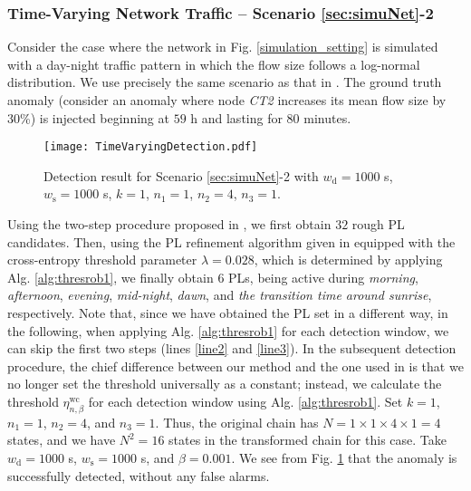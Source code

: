 \documentclass[10pt, twocolumn]{IEEEtran}
\begin{document}
\subsubsection{Time-Varying Network Traffic -- Scenario
  \ref{sec:simuNet}-2}

Consider the case where the network in Fig. \ref{simulation_setting} is
simulated with a day-night traffic pattern in which the flow size
follows a log-normal distribution. We use precisely the same scenario as
that in \cite[Sec. IV.B.2]{robust-anomaly-tcns}. The ground truth
anomaly (consider an anomaly where node \textit{CT2} increases its mean
flow size by 30\%) is injected beginning at $59$ h and lasting for $80$
minutes.

\begin{figure}[ht]  
	\centering
	\texttt{[image: TimeVaryingDetection.pdf]}
	\caption{Detection result for Scenario \ref{sec:simuNet}-2 with $w_{\text{d}} = 1000$ s, $w_{\text{s}} = 1000$ s, $k =1$, $n_1 = 1$, $n_2 = 4$, $n_3 = 1$.}
	\label{time-varying-detect}
\end{figure}
Using the two-step procedure proposed in
\cite[Sec. III.C]{robust-anomaly-tcns}, we first obtain $32$ rough PL
candidates. Then, using the PL refinement algorithm given in
\cite[Sec. III.D]{robust-anomaly-tcns} equipped with the cross-entropy
threshold parameter $\lambda = 0.028$, which is
determined by applying Alg. \ref{alg:thresrob1}, we finally obtain $6$
PLs, being active during \textit{morning}, \textit{afternoon},
\textit{evening}, \textit{mid-night}, \textit{dawn}, and \textit{the
  transition time around sunrise}, respectively. Note that, since we
have obtained the PL set in a different way, in the following, when
applying Alg. \ref{alg:thresrob1} for each detection window, we can skip
the first two steps (lines \ref{line2} and \ref{line3}). In the
subsequent detection procedure, the chief difference between our method
and the one used in \cite{robust-anomaly-tcns} is that we no longer set
the threshold universally as a constant; instead, we calculate the
threshold $\eta_{n,\beta}^{\text{wc}}$ for each detection window using
Alg. \ref{alg:thresrob1}. Set $k = 1$, $n_1 = 1$, $n_2 = 4$, and $n_3 =
1$. Thus, the original chain has $N = 1 \times 1 \times 4 \times 1 = 4$
states, and we have $N^2 = 16$ states in the transformed chain for this
case. Take $w_{\text{d}} = 1000$ s, $w_{\text{s}} = 1000$ s, and $\beta = 0.001$.  We see
from Fig. \ref{time-varying-detect} that the anomaly is successfully
detected, without any false alarms.
\end{document}
